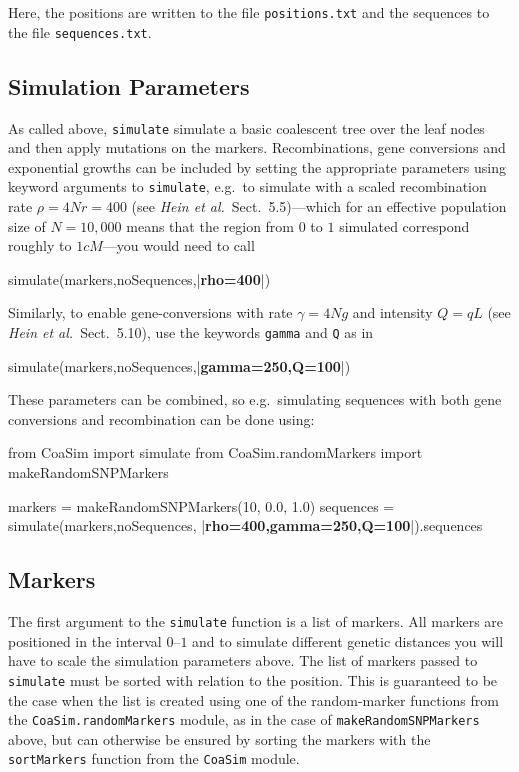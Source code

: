 \documentclass{manual}
\begin{document}
\begin{empfile}
\noindent
Here, the positions are written to the file \texttt{positions.txt} and
the sequences to the file \texttt{sequences.txt}.  


\subsection{Simulation Parameters}
\label{sec:simul-param}

As called above, \texttt{simulate} simulate a basic coalescent tree
over the leaf nodes and then apply mutations on the markers.
Recombinations, gene conversions and exponential growths can be
included by setting the appropriate parameters using keyword arguments
to \texttt{simulate}, e.g.\ to simulate with a scaled recombination
rate $\rho=4Nr=400$ (see \emph{Hein et al.}\ Sect.~5.5)---which for an
effective population size of $N=10,000$ means that the region from $0$
to $1$ simulated correspond roughly to $1cM$---you would need to call
\begin{code}
simulate(markers,noSequences,|\textbf{rho=400}|)
\end{code}

\noindent
Similarly, to enable gene-conversions with rate $\gamma=4Ng$ and
intensity $Q=qL$ (see \emph{Hein et al.}\ Sect.~5.10), use the
keywords \texttt{gamma} and \texttt{Q} as in
\begin{code}
simulate(markers,noSequences,|\textbf{gamma=250,Q=100}|)
\end{code}

\noindent
These parameters can be combined, so e.g.\ simulating sequences with both
gene conversions and recombination can be done using:
\begin{code}
from CoaSim import simulate
from CoaSim.randomMarkers import makeRandomSNPMarkers

markers = makeRandomSNPMarkers(10, 0.0, 1.0)
sequences = simulate(markers,noSequences,
                     |\textbf{rho=400,gamma=250,Q=100}|).sequences
\end{code}


\subsection{Markers}
\label{sec:markers}

The first argument to the \texttt{simulate} function is a list of
markers.  All markers are positioned in the interval $0$--$1$ and to
simulate different genetic distances you will have to scale the
simulation parameters above.  The list of markers passed to
\texttt{simulate} must be sorted with relation to the position.  This
is guaranteed to be the case when the list is created using one of the
random-marker functions from the \texttt{CoaSim.randomMarkers} module,
as in the case of \texttt{makeRandomSNPMarkers} above, but can
otherwise be ensured by sorting the markers with the
\texttt{sortMarkers} function from the \texttt{CoaSim} module.


\end{empfile}
\end{document}

